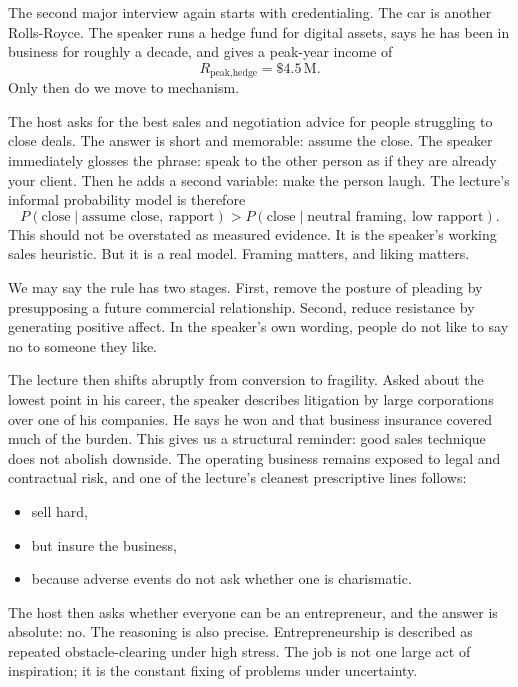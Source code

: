 The second major interview again starts with credentialing. The car is another Rolls-Royce. The speaker runs a hedge fund for digital assets, says he has been in business for roughly a decade, and gives a peak-year income of
\begin{equation}
R_{\text{peak,hedge}}=\text{\$}4.5\,\mathrm{M}.
\end{equation}
Only then do we move to mechanism.

The host asks for the best sales and negotiation advice for people struggling to close deals. The answer is short and memorable: assume the close. The speaker immediately glosses the phrase: speak to the other person as if they are already your client. Then he adds a second variable: make the person laugh. The lecture's informal probability model is therefore
\begin{equation}
P(\text{close}\mid \text{assume close},\ \text{rapport})
>
P(\text{close}\mid \text{neutral framing},\ \text{low rapport}).
\end{equation}
This should not be overstated as measured evidence. It is the speaker's working sales heuristic. But it is a real model. Framing matters, and liking matters.

We may say the rule has two stages. First, remove the posture of pleading by presupposing a future commercial relationship. Second, reduce resistance by generating positive affect. In the speaker's own wording, people do not like to say no to someone they like.

The lecture then shifts abruptly from conversion to fragility. Asked about the lowest point in his career, the speaker describes litigation by large corporations over one of his companies. He says he won and that business insurance covered much of the burden. This gives us a structural reminder: good sales technique does not abolish downside. The operating business remains exposed to legal and contractual risk, and one of the lecture's cleanest prescriptive lines follows:
\begin{itemize}
\item sell hard,
\item but insure the business,
\item because adverse events do not ask whether one is charismatic.
\end{itemize}

The host then asks whether everyone can be an entrepreneur, and the answer is absolute: no. The reasoning is also precise. Entrepreneurship is described as repeated obstacle-clearing under high stress. The job is not one large act of inspiration; it is the constant fixing of problems under uncertainty.

